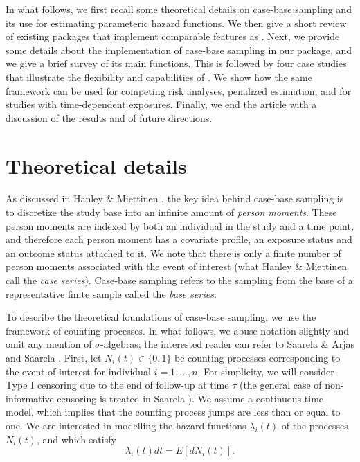 \documentclass[
]{jss}
\begin{document}
In what follows, we first recall some theoretical details on case-base
sampling and its use for estimating parameteric hazard functions. We
then give a short review of existing  packages that
implement comparable features as . Next, we provide some
details about the implementation of case-base sampling in our package,
and we give a brief survey of its main functions. This is followed by
four case studies that illustrate the flexibility and capabilities of
. We show how the same framework can be used for competing
risk analyses, penalized estimation, and for studies with time-dependent
exposures. Finally, we end the article with a discussion of the results
and of future directions.

\hypertarget{theoretical-details}{%
\section{Theoretical details}\label{theoretical-details}}

As discussed in Hanley \& Miettinen \citeyearpar{hanley2009fitting}, the
key idea behind case-base sampling is to discretize the study base into
an infinite amount of \emph{person moments}. These person moments are
indexed by both an individual in the study and a time point, and
therefore each person moment has a covariate profile, an exposure status
and an outcome status attached to it. We note that there is only a
finite number of person moments associated with the event of interest
(what Hanley \& Miettinen call the \emph{case series}). Case-base
sampling refers to the sampling from the base of a representative finite
sample called the \emph{base series}.

To describe the theoretical foundations of case-base sampling, we use
the framework of counting processes. In what follows, we abuse notation
slightly and omit any mention of \(\sigma\)-algebras; the interested
reader can refer to Saarela \& Arjas \citeyearpar{saarela2015non} and
Saarela \citeyearpar{saarela2016case}. First, let
\(N_{i}(t) \in \{0, 1\}\) be counting processes corresponding to the
event of interest for individual \(i=1, \ldots,n\). For simplicity, we
will consider Type I censoring due to the end of follow-up at time
\(\tau\) (the general case of non-informative censoring is treated in
Saarela \citeyearpar{saarela2016case}). We assume a continuous time
model, which implies that the counting process jumps are less than or
equal to one. We are interested in modelling the hazard functions
\(\lambda_{i}(t)\) of the processes \(N_i(t)\), and which satisfy
\[\lambda_{i}(t) dt = E[dN_{i}(t)].\]
\end{document}
